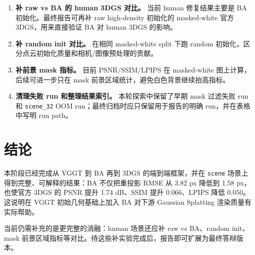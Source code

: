 \documentclass[UTF8,a4paper,11pt]{ctexart}
\begin{document}
\begin{enumerate}[leftmargin=2em]
    \item \textbf{补 raw vs BA 的 human 3DGS 对比。} 当前 human 修复结果主要是 BA 初始化。最终报告可再补 raw high-density 初始化的 masked-white 官方 3DGS，用来直接验证 BA 对 human 3DGS 的影响。
    \item \textbf{补 random init 对比。} 在相同 masked-white split 下跑 random 初始化，区分点云初始化质量和相机/图像预处理的贡献。
    \item \textbf{补前景 mask 指标。} 目前 PSNR/SSIM/LPIPS 在 masked-white 图上计算，后续可进一步只在 mask 前景区域统计，避免白色背景继续抬高指标。
    \item \textbf{清理失败 run 和整理结果索引。} 本轮探索中保留了早期 mask 过滤失败 run 和 \texttt{scene\_32} OOM run；最终归档时应只保留用于报告的明确 run，并在表格中写明 run path。
\end{enumerate}

\section{结论}

本阶段已经完成从 VGGT 到 BA 再到 3DGS 的端到端框架，并在 \texttt{scene} 场景上得到完整、可解释的结果：BA 不仅把重投影 RMSE 从 3.82 px 降低到 1.58 px，也使官方 3DGS 的 PSNR 提升 1.74 dB、SSIM 提升 0.066、LPIPS 降低 0.050。这说明在 VGGT 初始几何基础上加入 BA 对下游 Gaussian Splatting 渲染质量有实际帮助。

当前仍需补充的是更完整的消融：human 场景还应补 raw vs BA、random init、mask 前景区域指标等对比。待这些补实验完成后，报告即可扩展为最终答辩版本。
\end{document}
